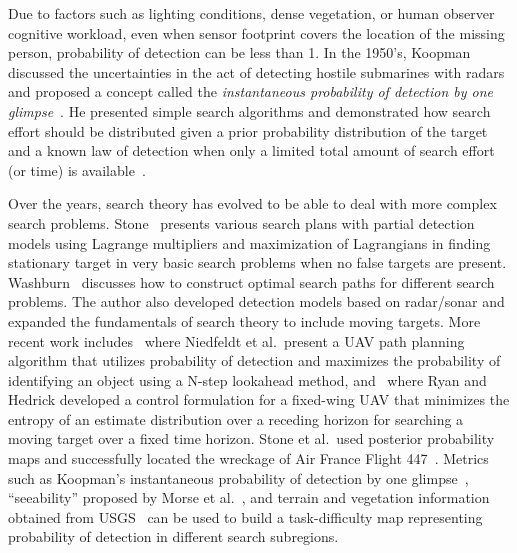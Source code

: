 Due to factors such as lighting conditions, dense vegetation, or human observer cognitive workload, even when sensor footprint covers the location of the missing person, probability of detection can be less than 1. In the 1950's, Koopman discussed the uncertainties in the act of detecting hostile submarines with radars and proposed a concept called the \textit{instantaneous probability of detection by one glimpse}~\cite{Koopman1956Theory}. He presented simple search algorithms and demonstrated how search effort should be distributed given a prior probability distribution of the target and a known law of detection when only a limited total amount of search effort (or time) is available~\cite{Koopman1957Theory}. 

Over the years, search theory has evolved to be able to deal with more complex search problems. Stone~\cite{Stone1975Theory} presents various search plans with partial detection models using Lagrange multipliers and maximization of Lagrangians in finding stationary target in very basic search problems when no false targets are present. Washburn~\cite{Washburn1981Search} discusses how to construct optimal search paths for different search problems. The author also developed detection models based on radar/sonar and expanded the fundamentals of search theory to include moving targets. More recent work includes~\cite{Niedfeldt2010integrated} where Niedfeldt et al.\ present a UAV path planning algorithm that utilizes probability of detection and maximizes the probability of identifying an object using a N-step lookahead method, and~\cite{Ryan2010particle} where Ryan and Hedrick developed a control formulation for a fixed-wing UAV that minimizes the entropy of an estimate distribution over a receding horizon for searching a moving target over a fixed time horizon. Stone et al.\ used posterior probability maps and successfully located the wreckage of Air France Flight 447~\cite{Stone2011Search}. Metrics such as Koopman's instantaneous probability of detection by one glimpse~\cite{Koopman1956Theory}, ``seeability'' proposed by Morse et al.\ \cite{Morse2010UAV}, and terrain and vegetation information obtained from USGS~\cite{Lin2010Bayesian} can be used to build a task-difficulty map representing probability of detection in different search subregions.

